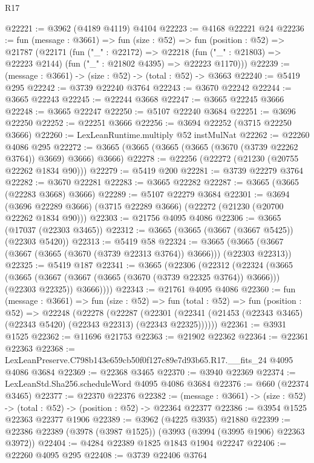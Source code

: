 \begin{lexlean}{R17}
\begin{coremodule}
@22221 := @3962 (@4189 @4119) @4104
@22223 := @4168 @22221 @24
@22236 := fun (message : @3661) =>
  fun (size : @52) =>
  fun (position : @52) =>
  @21787
    (@22171
      (fun ("_" : @22172) =>
      @22218 (fun ("_" : @21803) => @22223 @2144) (fun ("_" : @21802 @4395) => @22223 @1170)))
@22239 := (message : @3661) -> (size : @52) -> (total : @52) -> @3663
@22240 := @5419 @295
@22242 := @3739 @22240 @3764
@22243 := @3670 @22242
@22244 := @3665 @22243
@22245 := @22244 @3668
@22247 := @3665 @22245 @3666
@22248 := @3665 @22247
@22250 := @5107 @22240 @3684
@22251 := @3696 @22250
@22252 := @22251 @3666
@22256 := @3694 @22252 (@3715 @22250 @3666)
@22260 := LexLeanRuntime.multiply @52 instMulNat
@22262 := @22260 @4086 @295
@22272 := @3665 (@3665 (@3665 (@3665 (@3670 (@3739 @22262 @3764)) @3669) @3666) @3666)
@22278 := @22256 (@22272 (@21230 (@20755 @22262 @1834 @90)))
@22279 := @5419 @200
@22281 := @3739 @22279 @3764
@22282 := @3670 @22281
@22283 := @3665 @22282
@22287 := @3665 (@3665 (@22283 @3668) @3666)
@22289 := @5107 @22279 @3684
@22301 := @3694
    (@3696 @22289 @3666)
    (@3715 @22289 @3666)
    (@22272 (@21230 (@20700 @22262 @1834 @90)))
@22303 := @21756 @4095 @4086
@22306 := @3665 (@17037 (@22303 @3465))
@22312 := @3665 (@3665 (@3667 (@3667 @5425)) (@22303 @5420))
@22313 := @5419 @58
@22324 := @3665 (@3665 (@3667 (@3667 (@3665 (@3670 (@3739 @22313 @3764)) @3666))) (@22303 @22313))
@22325 := @5419 @187
@22341 := @3665
    (@22306
      (@22312
        (@22324
          (@3665
            (@3665 (@3667 (@3667 (@3665 (@3670 (@3739 @22325 @3764)) @3666))) (@22303 @22325))
            @3666))))
@22343 := @21761 @4095 @4086
@22360 := fun (message : @3661) =>
  fun (size : @52) =>
  fun (total : @52) =>
  fun (position : @52) =>
  @22248
    (@22278
      (@22287
        (@22301 (@22341 (@21453 (@22343 @3465) (@22343 @5420) (@22343 @22313) (@22343 @22325))))))
@22361 := @3931 @1525
@22362 := @11696 @21753
@22363 := @21902 @22362
@22364 := @22361 @22363
@22368 := LexLeanPreserve.C798b143e659cb50f0f127c89e7d93b65.R17.__fits_24 @4095 @4086 @3684
@22369 := @22368 @3465
@22370 := @3940 @22369
@22374 := LexLeanStd.Sha256.scheduleWord @4095 @4086 @3684
@22376 := @660 (@22374 @3465)
@22377 := @22370 @22376
@22382 := (message : @3661) -> (size : @52) -> (total : @52) -> (position : @52) -> @22364 @22377
@22386 := @3954 @1525 @22363 @22377 @1906
@22389 := @3962 (@4225 @3935) @21880
@22399 := @22386 @22389 (@3978 (@3987 @1525)) (@3993 (@3994 (@3995 @1906) @22363 @3972))
@22404 := @4284 @22389 @1825 @1843 @1904 @22247
@22406 := @22260 @4095 @295
@22408 := @3739 @22406 @3764

\end{coremodule}
\end{lexlean}
